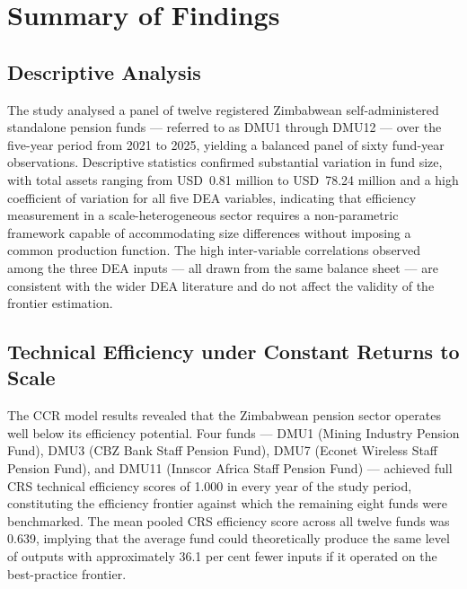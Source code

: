 \documentclass[12pt,a4paper]{article}
\begin{document}
\section{Summary of Findings}

\subsection{Descriptive Analysis}

The study analysed a panel of twelve registered Zimbabwean self-administered standalone pension funds --- referred to as DMU1 through DMU12 --- over the five-year period from 2021 to 2025, yielding a balanced panel of sixty fund-year observations. Descriptive statistics confirmed substantial variation in fund size, with total assets ranging from USD~0.81 million to USD~78.24 million and a high coefficient of variation for all five DEA variables, indicating that efficiency measurement in a scale-heterogeneous sector requires a non-parametric framework capable of accommodating size differences without imposing a common production function. The high inter-variable correlations observed among the three DEA inputs --- all drawn from the same balance sheet --- are consistent with the wider DEA literature and do not affect the validity of the frontier estimation.

\subsection{Technical Efficiency under Constant Returns to Scale}

The CCR model results revealed that the Zimbabwean pension sector operates well below its efficiency potential. Four funds --- DMU1 (Mining Industry Pension Fund), DMU3 (CBZ Bank Staff Pension Fund), DMU7 (Econet Wireless Staff Pension Fund), and DMU11 (Innscor Africa Staff Pension Fund) --- achieved full CRS technical efficiency scores of 1.000 in every year of the study period, constituting the efficiency frontier against which the remaining eight funds were benchmarked. The mean pooled CRS efficiency score across all twelve funds was 0.639, implying that the average fund could theoretically produce the same level of outputs with approximately 36.1 per cent fewer inputs if it operated on the best-practice frontier.
\end{document}
